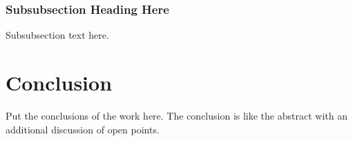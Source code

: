 \documentclass[10pt,        %
               a4paper,     %
               journal,     %
               ]{IEEEtran}
\begin{document}
\subsubsection{Subsubsection Heading Here}
Subsubsection text here.

\section{Conclusion}
Put the conclusions of the work here. The conclusion is like the abstract with
an additional discussion of open points.

\ifCLASSOPTIONcaptionsoff
  \newpage
\fi




\newpage



%
\end{document}
